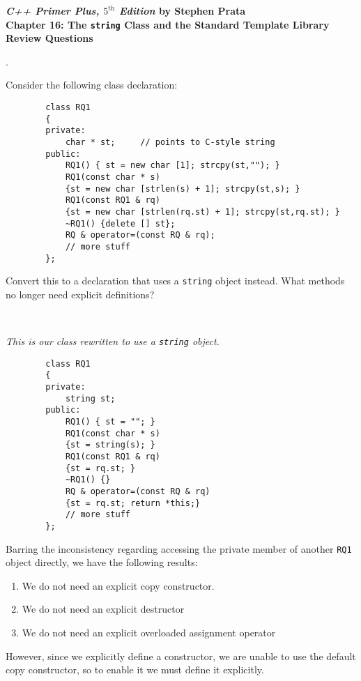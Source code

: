 \documentclass{amsart}
\begin{document}
\begin{center}
	\Large {\bfseries
	\emph{C++ Primer Plus, $5^{\text{th}}$ Edition} by Stephen Prata \\
	Chapter 16: The \texttt{string} Class and the Standard Template Library \\
	Review Questions} \normalsize \vspace{5ex}
\end{center}


\phantom{\quad}\vfill
{}. 
\begin{minipage}[t]{11.5 cm}
	Consider the following class declaration:
	\begin{verbatim}
		class RQ1
		{
		private:
		    char * st;     // points to C-style string
		public:
		    RQ1() { st = new char [1]; strcpy(st,""); }
		    RQ1(const char * s)
		    {st = new char [strlen(s) + 1]; strcpy(st,s); }
		    RQ1(const RQ1 & rq)
		    {st = new char [strlen(rq.st) + 1]; strcpy(st,rq.st); }
		    ~RQ1() {delete [] st};
		    RQ & operator=(const RQ & rq);
		    // more stuff
		};
	\end{verbatim}
	Convert this to a declaration that uses a \texttt{string} object instead. What methods no longer need explicit definitions?
\end{minipage} \\[1ex]
\phantom{3. } 
\begin{minipage}[t]{11.5 cm}
	{\slshape 
		This is our class rewritten to use a \verb+string+ object.
	\begin{verbatim}
		class RQ1
		{
		private:
		    string st;
		public:
		    RQ1() { st = ""; }
		    RQ1(const char * s)
		    {st = string(s); }
		    RQ1(const RQ1 & rq)
		    {st = rq.st; }
		    ~RQ1() {}
		    RQ & operator=(const RQ & rq)
		    {st = rq.st; return *this;}
		    // more stuff
		};
	\end{verbatim}
	Barring the inconsistency regarding accessing the private member
	of another \verb+RQ1+ object directly, we have the following 
	results: 
	\begin{enumerate}
		\item
			We do not need an explicit copy constructor.
		\item
			We do not need an explicit destructor
		\item 
			We do not need an explicit overloaded assignment operator
	\end{enumerate}
	However, since we explicitly define a constructor, we are
	unable to use the default copy constructor, so to enable it
	we must define it explicitly.
	} 
\end{minipage} 
\vfill
\newpage
\end{document}
